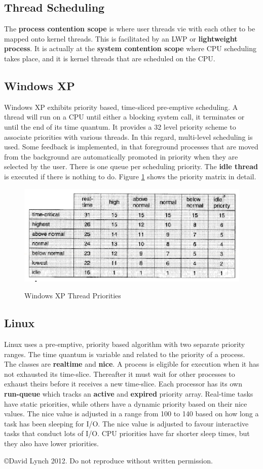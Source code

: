 \documentclass[10pt,a4paper]{article}
\begin{document}
\subsection{Thread Scheduling}
The {\bf process contention scope} is where user threads vie with each other to be mapped onto kernel threads. This is facilitated by an LWP or {\bf lightweight process}. It is actually at the {\bf system contention scope} where CPU scheduling takes place, and it is kernel threads that are  scheduled on the CPU. 
\subsection{Windows XP}
Windows XP exhibits priority based, time-sliced pre-emptive scheduling. A thread will run on a CPU until either a blocking system call, it terminates or until the end of its time quantum. It provides a 32 level priority scheme to associate priorities with various threads. In this regard, multi-level scheduling is used. Some feedback is implemented, in that foreground processes that are moved from the background are automatically promoted in priority when they are selected by the user. There is one queue per scheduling priority. The {\bf idle thread} is executed if there is nothing to do. Figure \ref{xpched} shows the priority matrix in detail. 
\begin{figure}
\caption{Windows XP Thread Priorities \cite{OSCONCEPTS}}
\begin{center}
\includegraphics[scale=0.45]{../images/xp-sched.png}
\label{xpched}
\end{center}
\end{figure}
\subsection{Linux}
Linux uses a pre-emptive, priority based algorithm with two separate priority ranges. The time quantum is variable and related to the priority of a process. The classes are {\bf realtime} and {\bf nice}. A process is eligible for execution when it has not exhausted its time-slice. Thereafter it must wait for other processes to exhaust theirs before it receives a new time-slice. Each processor has its own {\bf run-queue} which tracks an {\bf active} and {\bf expired} priority array. Real-time tasks have static priorities, while others have a dynamic priority based on their nice values.  The nice value is adjusted in a range from 100 to 140 based on how long a task has been sleeping for I/O. The nice value is adjusted to favour interactive tasks that conduct lots of I/O. CPU priorities have far shorter sleep times, but they also have lower priorities. 

{}

\begin{center}
{\small \copyright  David Lynch 2012. Do not reproduce without written permission.}
\end{center}
\end{document}
